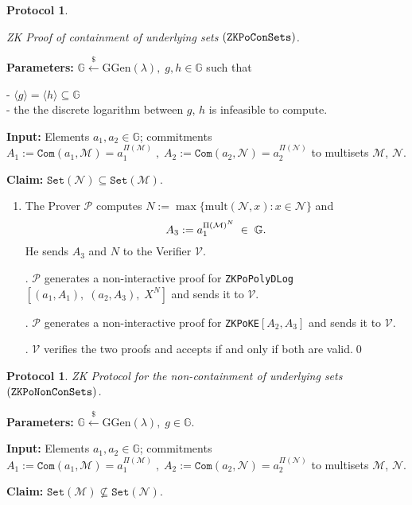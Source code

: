 \documentclass[11pt, lettersize, notitlepage, leqno, footskip=0.6cm]{article}
\newcommand{\ttt}{\texttt}
\newcommand{\bG}{\mathbb{G}}
\newcommand{\sett}{\ttt{Set}}
\newcommand{\la}{\langle}
\newcommand{\ra}{\rangle}
\newcommand{\mc}{\mathcal}
\newcommand{\mb}{\mathbb}
\newcommand{\mr}{\mathrm}
\newcommand{\lamb}{\lambda}
\newcommand{\sub}{\subseteq}
\newcommand{\nsub}{\nsubseteq}
\newcommand{\mP}{\mc{P}}
\newcommand{\V}{\mc{V}}
\newcommand{\vs}{\vspace{-0.15cm}}
\newcommand{\noin}{\noindent}
\newtheorem{Prot}[Thm]{Protocol}
\numberwithin{equation}{section}
\begin{document}
\begin{Prot} \hypertarget{Sets}{ZK Proof of containment of underlying sets $(\tt{ZKPoConSets})$.}\end{Prot} \vspace{-0.3cm}

\noin \textbf{Parameters:} $\mb{G}\xleftarrow{\$} \mr{GGen}(\lamb), \; g, h\in \mb{G}$ such that

\noin - $\la g \ra = \la h \ra\sub \bG$ \\
\noin - the the discrete logarithm between $g$, $h$ is infeasible to compute.

\noin \textbf{Input:} Elements $a_1,a_2\in\mb{G}$; commitments $A_1 := \ttt{Com}(a_1, \mc{M}) = a_1^{\Pi(\mc{M})}\;,\;A_2 := \ttt{Com}(a_2, \mc{N})= a_2^{\Pi(\mc{N})}$ to multisets $\mc{M}$, $\mc{N}$.

\noin \textbf{Claim:} $\sett(\mc{N})\sub \sett(\mc{M})$. \vs

\begin{enumerate}[wide, labelwidth=!, labelindent=0pt] \item The Prover $\mP$ computes $N:= \max\{\mr{mult}(\mc{N}, x):x \in \mc{N}\}$ and \vs $$A_3:= a_1^{\Pi(\mc{M})^N}\;\in\;\bG. \vs $$ He sends $A_3$ and $N$ to the Verifier $\V$.

\noin 2. $\mP$ generates a non-interactive proof for \verb|ZKPoPolyDLog|$[(a_1, A_1),\;(a_2, A_3),\;X^N]$ and sends it to $\V$.

\noin 3. $\mP$ generates a non-interactive proof for \verb|ZKPoKE|$[A_2,A_3]$ and sends it to $\V$.

\noin 4. $\V$ verifies the two proofs and accepts if and only if both are valid.\qed \end{enumerate}


\begin{Prot} ZK Protocol for the non-containment of underlying sets $(\tt{ZKPoNonConSets})$.\end{Prot}\vspace{-0.3cm}

\noin \textbf{Parameters:} $\mb{G}\xleftarrow{\$} \mr{GGen}(\lamb), \; g\in \mb{G}$. 

\noin \textbf{Input:} Elements $a_1,a_2\in\mb{G}$; commitments $A_1 := \ttt{Com}(a_1, \mc{M}) = a_1^{\Pi(\mc{M})}\;,\;A_2 := \ttt{Com}(a_2, \mc{N})= a_2^{\Pi(\mc{N})}$ to multisets $\mc{M}$, $\mc{N}$.

\noin \textbf{Claim:} $\sett(\mc{M})\nsub \sett(\mc{N})$. \vs
\end{document}
